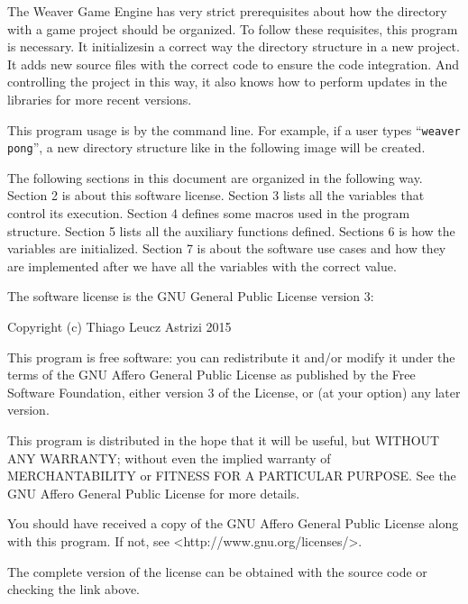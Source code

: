 The Weaver Game Engine has very strict prerequisites about how the
directory with a game project should be organized. To follow these
requisites, this program is necessary. It initializesin a correct way
the directory structure in a new project. It adds new source files
with the correct code to ensure the code integration. And controlling
the project in this way, it also knows how to perform updates in the
libraries for more recent versions.

This program usage is by the command line. For example, if a user
types ``{\tt weaver pong}'', a new directory structure like in the
following image will be created.


The following sections in this document are organized in the following
way. Section 2 is about this software license. Section 3 lists all the
variables that control its execution. Section 4 defines some macros
used in the program structure. Section 5 lists all the auxiliary
functions defined. Sections 6 is how the variables are
initialized. Section 7 is about the software use cases and how they
are implemented after we have all the variables with the correct
value.


The software license is the GNU General Public License version 3:

\espaco{5mm}\linha
\alinhaverbatim
Copyright (c) Thiago Leucz Astrizi 2015

This program is free software: you can redistribute it and/or
modify it under the terms of the GNU Affero General Public License as
published by the Free Software Foundation, either version 3 of
the License, or (at your option) any later version.

This program is distributed in the hope that it will be useful,
but WITHOUT ANY WARRANTY; without even the implied warranty of
MERCHANTABILITY or FITNESS FOR A PARTICULAR PURPOSE.  See the
GNU Affero General Public License for more details.

You should have received a copy of the GNU Affero General Public
License along with this program.  If not, see
<http://www.gnu.org/licenses/>.
\alinhanormal

\linha\espaco{5mm}

The complete version of the license can be obtained with the source
code or checking the link above.


